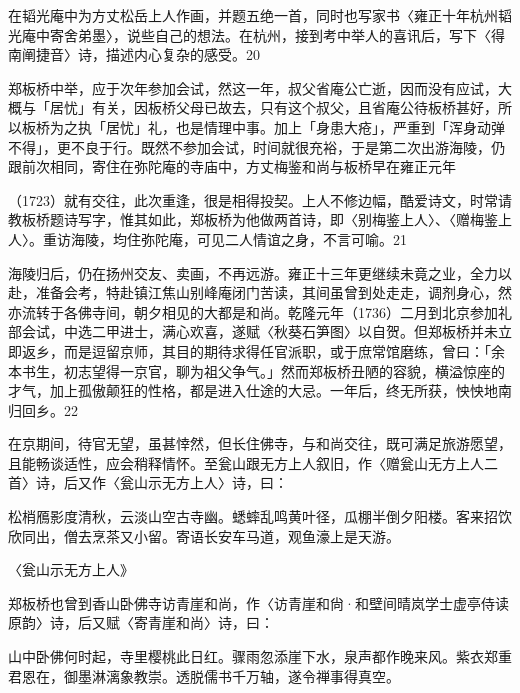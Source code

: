 在韬光庵中为方丈松岳上人作画，并题五绝一首，同时也写家书〈雍正十年杭州韬光庵中寄舍弟墨〉，说些自己的想法。在杭州，接到考中举人的喜讯后，写下〈得南阐捷音〉诗，描述内心复杂的感受。20

郑板桥中举，应于次年参加会试，然这一年，叔父省庵公亡逝，因而没有应试，大概与「居忧」有关，因板桥父母已故去，只有这个叔父，且省庵公待板桥甚好，所以板桥为之执「居忧」礼，也是情理中事。加上「身患大疮」，严重到「浑身动弹不得」，更不良于行。既然不参加会试，时间就很充裕，于是第二次出游海陵，仍跟前次相同，寄住在弥陀庵的寺庙中，方丈梅鉴和尚与板桥早在雍正元年

\vfill
\begin{BookNotes}
\end{BookNotes}

\noindent （1723）就有交往，此次重逢，很是相得投契。上人不修边幅，酷爱诗文，时常请教板桥题诗写字，惟其如此，郑板桥为他做两首诗，即〈别梅鉴上人〉、〈赠梅鉴上人〉。重访海陵，均住弥陀庵，可见二人情谊之身，不言可喻。21

海陵归后，仍在扬州交友、卖画，不再远游。雍正十三年更继续未竟之业，全力以赴，准备会考，特赴镇江焦山别峰庵闭门苦读，其间虽曾到处走走，调剂身心，然亦流转于各佛寺间，朝夕相见的大都是和尚。乾隆元年（1736）二月到北京参加礼部会试，中选二甲进士，满心欢喜，遂赋〈秋葵石笋图〉以自贺。但郑板桥并未立即返乡，而是逗留京师，其目的期待求得任官派职，或于庶常馆磨练，曾曰：「余本书生，初志望得一京官，聊为祖父争气。」然而郑板桥丑陋的容貌，横溢惊座的才气，加上孤傲颠狂的性格，都是进入仕途的大忌。一年后，终无所获，怏怏地南归回乡。22

在京期间，待官无望，虽甚悻然，但长住佛寺，与和尚交往，既可满足旅游愿望，且能畅谈适性，应会稍释情怀。至瓮山跟无方上人叙旧，作〈赠瓮山无方上人二首〉诗，后又作〈瓮山示无方上人〉诗，曰：

\begin{BookQuote}
松梢鴈影度清秋，云淡山空古寺幽。蟋蟀乱鸣黄叶径，瓜棚半倒夕阳楼。客来招饮欣同出，僧去烹茶又小留。寄语长安车马道，观鱼濠上是天游。
\end{BookQuote}

〈瓮山示无方上人》

郑板桥也曾到香山卧佛寺访青崖和尚，作〈访青崖和尙·和壁间晴岚学士虚亭侍读原韵〉诗，后又赋〈寄青崖和尚〉诗，曰：

\begin{BookQuote}
山中卧佛何时起，寺里樱桃此日红。骤雨忽添崖下水，泉声都作晚来风。紫衣郑重君恩在，御墨淋漓象教崇。透脱儒书千万轴，遂令禅事得真空。
\end{BookQuote}

